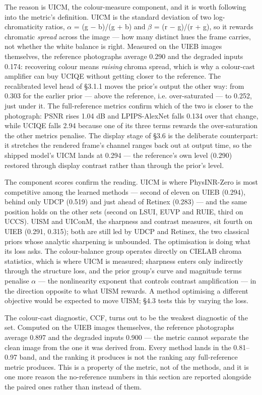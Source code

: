 \documentclass[journal]{IEEEtran}
\begin{document}
The reason is UICM, the colour-measure component, and it is worth following into the metric's definition. UICM is the standard deviation of two log-chromaticity ratios, $\alpha$ = (g $-$ b)/(g + b) and $\beta$ = (r $-$ g)/(r + g), so it rewards chromatic \emph{spread} across the image --- how many distinct hues the frame carries, not whether the white balance is right. Measured on the UIEB images themselves, the reference photographs average 0.290 and the degraded inputs 0.174: recovering colour means \emph{raising} chroma spread, which is why a colour-cast amplifier can buy UCIQE without getting closer to the reference. The recalibrated level head of \S{}3.1.1 moves the prior's output the other way: from 0.303 for the earlier prior --- above the reference, i.e. over-saturated --- to 0.252, just under it. The full-reference metrics confirm which of the two is closer to the photograph: PSNR rises 1.04 dB and LPIPS-AlexNet falls 0.134 over that change, while UCIQE falls 2.94 because one of its three terms rewards the over-saturation the other metrics penalise. The display stage of \S{}3.6 is the deliberate counterpart: it stretches the rendered frame's channel ranges back out at output time, so the shipped model's UICM lands at 0.294 --- the reference's own level (0.290) restored through display contrast rather than through the prior's level.

The component scores confirm the reading. UICM is where PhysINR-Zero is most competitive among the learned methods --- second of eleven on UIEB (0.294), behind only UDCP (0.519) and just ahead of Retinex (0.283) --- and the same position holds on the other sets (second on LSUI, EUVP and RUIE, third on UCCS). UISM and UIConM, the sharpness and contrast measures, sit fourth on UIEB (0.291, 0.315); both are still led by UDCP and Retinex, the two classical priors whose analytic sharpening is unbounded. The optimisation is doing what its loss asks. The colour-balance group operates directly on CIELAB chroma statistics, which is where UICM is measured; sharpness enters only indirectly through the structure loss, and the prior group's curve and magnitude terms penalise $\alpha$ --- the nonlinearity exponent that controls contrast amplification --- in the direction opposite to what UISM rewards. A method optimising a different objective would be expected to move UISM; \S{}4.3 tests this by varying the loss.

The colour-cast diagnostic, CCF, turns out to be the weakest diagnostic of the set. Computed on the UIEB images themselves, the reference photographs average 0.897 and the degraded inputs 0.900 --- the metric cannot separate the clean image from the one it was derived from. Every method lands in the 0.81--0.97 band, and the ranking it produces is not the ranking any full-reference metric produces. This is a property of the metric, not of the methods, and it is one more reason the no-reference numbers in this section are reported alongside the paired ones rather than instead of them.
\end{document}
